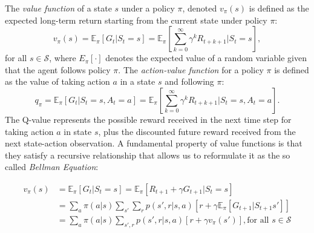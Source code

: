 The \textit{value function} of a state $s$ under a policy $\pi$, denoted $v_\pi(s)$ is defined as the expected long-term return starting from the current state under policy $\pi$: 
\begin{equation}
v_\pi(s) = \mathbb{E}_\pi{\left[G_t|S_t=s\right]}= \mathbb{E}_\pi\left[\sum^{\infty}_{k=0}\gamma^k R_{t+k+1}|S_t=s\right] , \label{eqn:value}
\end{equation} for all $s \in \mathcal{S}$, where $E_\pi[\cdot]$ denotes the expected value of a random variable given that the agent follows policy $\pi$.
The \textit{action-value function} for a policy $\pi$ is defined as the value of taking action $a$ in a state $s$ and following $\pi$:
\begin{equation} q_\pi = \mathbb{E}_\pi [G_t|S_t=s,A_t=a]= \mathbb{E}_\pi\left[\sum^{\infty}_{k=0}\gamma^k R_{t+k+1}|S_t=s,A_t=a \right] .\label{eqn:qv} \end{equation}
The Q-value represents the possible reward received in the next time step for taking action $a$ in state $s$, plus the discounted future reward received from the next state-action observation.
A fundamental property of value functions is that they satisfy a recursive relationship that allows us to reformulate it as the so called \textit{Bellman Equation}:



\begin{align} 
v_\pi(s) &= \mathbb{E}_\pi\left[G_t|S_t=s\right] =\mathbb{E}_\pi \left[R_{t+1}+\gamma G_{t+1}|S_t=s\right] \nonumber\\ 
&=  \sum_a\pi(a|s)\sum_{s'}\sum_r  p(s',r|s,a)\left[r+\gamma\mathbb{E}_\pi\left[G_{t+1}|S_{t+1}
s'\right]\right] \nonumber \\ 
&= \sum_a\pi(a|s)\sum_{s',r}p(s',r|s,a)\left[r+\gamma v_\pi(s')\right], \text{for all } s \in \mathcal{S} 
\end{align}


